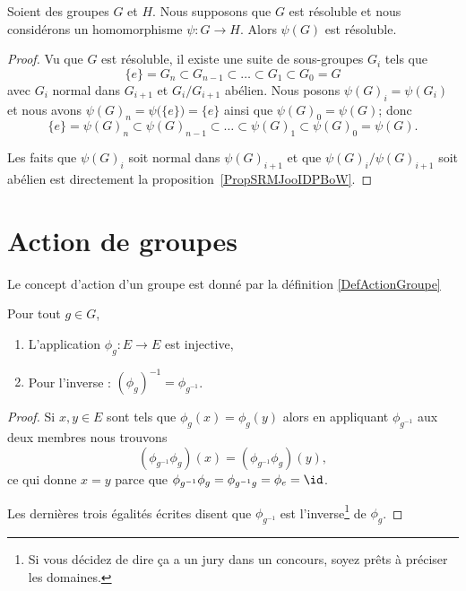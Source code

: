 \begin{proposition} \label{PropBNEZooJMDFIB}
    Soient des groupes \( G\) et \( H\). Nous supposons que \( G\) est résoluble et nous considérons un homomorphisme \( \psi\colon G\to H\). Alors \( \psi(G)\) est résoluble.
\end{proposition}

\begin{proof}
    Vu que \( G\) est résoluble, il existe une suite de sous-groupes \( G_i\) tels que
    \begin{equation}
        \{ e \}=G_n\subset G_{n-1}\subset\ldots\subset G_1\subset G_0=G
    \end{equation}
    avec \( G_i\) normal dans \( G_{i+1}\) et \( G_i/G_{i+1}\) abélien. Nous posons \( \psi(G)_i=\psi(G_i)\) et nous avons \( \psi(G)_n=\psi\big( \{ e \} \big)=\{ e \}\) ainsi que \( \psi(G)_0=\psi(G)\); donc
    \begin{equation}
        \{ e \}=\psi(G)_n\subset \psi(G)_{n-1}\subset\ldots\subset \psi(G)_1\subset \psi(G)_0=\psi(G).
    \end{equation}

    Les faits que \( \psi(G)_i\) soit normal dans \( \psi(G)_{i+1}\) et que \( \psi(G)_i/\psi(G)_{i+1}\) soit abélien est directement la proposition~\ref{PropSRMJooIDPBoW}.

\end{proof}

\section{Action de groupes}
Le concept d'action d'un groupe est donné par la définition \ref{DefActionGroupe}


\begin{lemma}
    Pour tout \( g\in G\),
    \begin{enumerate}
        \item
            L'application \( \phi_g\colon E\to E\) est injective,
        \item
            Pour l'inverse : \( (\phi_g)^{-1}=\phi_{g^{-1}}\).
    \end{enumerate}
\end{lemma}

\begin{proof}
    Si \( x,y\in E\) sont tels que \( \phi_g(x)=\phi_g(y)\) alors en appliquant \( \phi_{g^{-1}}\) aux deux membres nous trouvons
    \begin{equation}
        (\phi_{g^{-1}}\phi_g)(x)=(\phi_{g^{-1}}\phi_g)(y),
    \end{equation}
    ce qui donne \( x=y\) parce que \( \phi_{g^{-1}}\phi_g=\phi_{g^{-1}g}=\phi_e=\id\).

    Les dernières trois égalités écrites disent que \( \phi_{g^{-1}}\) est l'inverse\footnote{Si vous décidez de dire ça a un jury dans un concours, soyez prêts à préciser les domaines.} de \( \phi_g\).
\end{proof}

